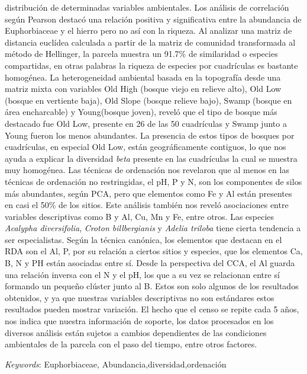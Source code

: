 \documentclass[11pt,]{article}
\renewenvironment{abstract}
 {{%
    \setlength{\leftmargin}{0mm}
    \setlength{\rightmargin}{\leftmargin}%
  }%
  \relax}
 {\endlist}
\begin{document}
\begin{abstract}
distribución de determinadas variables ambientales. Los análisis de
correlación según Pearson destacó una relación positiva y significativa
entre la abundancia de Euphorbiaceae y el hierro pero no así con la
riqueza. Al analizar una matriz de distancia euclídea calculada a partir
de la matriz de comunidad transformada al método de Hellinger, la
parcela muestra un 91.7\% de similaridad o especies compartidas, en
otras palabras la riqueza de especies por cuadrículas es bastante
homogénea. La heterogeneidad ambiental basada en la topografía desde una
matriz mixta con variables Old High (bosque viejo en relieve alto), Old
Low (bosque en vertiente baja), Old Slope (bosque relieve bajo), Swamp
(bosque en área encharcable) y Young(bosque joven), reveló que el tipo
de bosque más destacado fue Old Low, presente en 26 de las 50
cuadrículas y Swamp junto a Young fueron los menos abundantes. La
presencia de estos tipos de bosques por cuadrículas, en especial Old
Low, están geográficamente contiguos, lo que nos ayuda a explicar la
diversidad \emph{beta} presente en las cuadrículas la cual se muestra
muy homogénea. Las técnicas de ordenación nos revelaron que al menos en
las técnicas de ordenación no restringidas, el pH, P y N, son los
componentes de silos más abundantes, según PCA, pero que elementos como
Fe y Al están presentes en casi el 50\% de los sitios. Este análisis
también nos reveló asociaciones entre variables descriptivas como B y
Al, Cu, Mn y Fe, entre otros. Las especies \emph{Acalypha diversifolia},
\emph{Croton billbergianis} y \emph{Adelia triloba} tiene cierta
tendencia a ser especialistas. Según la técnica canónica, los elementos
que destacan en el RDA son el Al, P, por su relación a ciertos sitios y
especies, que los elementos Ca, B, N y PH están asociadas entre sí.
Desde la perspectiva del CCA, el Al guarda una relación inversa con el N
y el pH, los que a su vez se relacionan entre sí formando un pequeño
clúster junto al B. Estos son solo algunos de los resultados obtenidos,
y ya que nuestras variables descriptivas no son estándares estos
resultados pueden mostrar variación. El hecho que el censo se repite
cada 5 años, nos indica que nuestra información de soporte, los datos
procesados en los diversos análisis están sujetos a cambios dependientes
de las condiciones ambientales de la parcela con el paso del tiempo,
entre otros factores.


\vskip 8.5pt \noindent \emph{Keywords}: Euphorbiaceae, Abundancia,diversidad,ordenación \par

    \hbox{\vrule height .2pt width 39.14pc}



\end{abstract}
\end{document}
